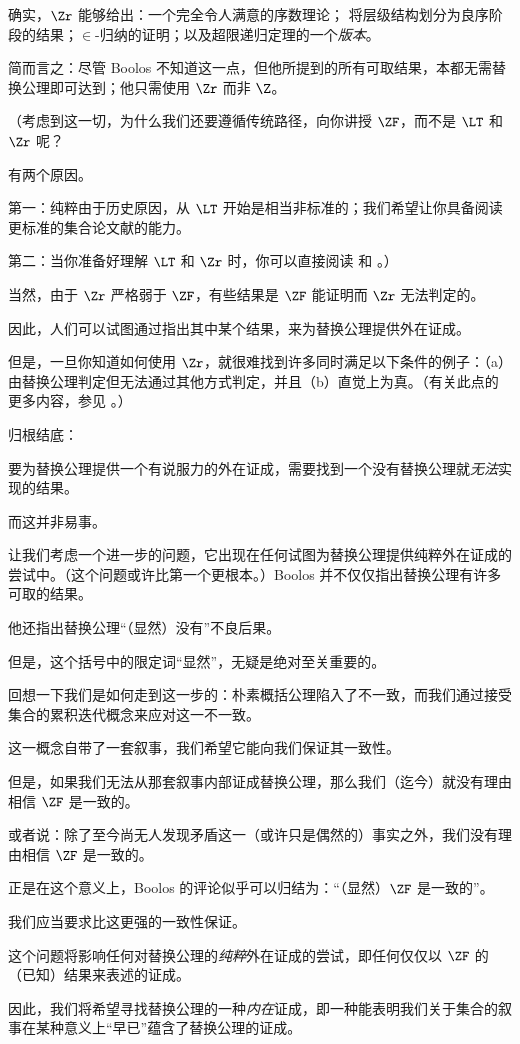 \documentclass[../../../include/open-logic-section]{subfiles}
\begin{document}
确实，$\Zr$ 能够给出：一个完全令人满意的序数理论；
将层级结构划分为良序阶段的结果；$\in$-归纳的证明；以及超限递归定理的一个\emph{版本}。

简而言之：尽管 Boolos 不知道这一点，但他所提到的所有可取结果，本都无需替换公理即可达到；他只需使用 $\Zr$ 而非 $\Z$。

（考虑到这一切，为什么我们还要遵循传统路径，向你讲授 $\ZF$，而不是 $\LT$ 和 $\Zr$ 呢？

有两个原因。

第一：纯粹由于历史原因，从 $\LT$ 开始是相当非标准的；我们希望让你具备阅读更标准的集合论文献的能力。

第二：当你准备好理解 $\LT$ 和 $\Zr$ 时，你可以直接阅读 \citealt{Potter2004} 和 \citealt{ButtonLT1}。）

当然，由于 $\Zr$ 严格弱于 $\ZF$，有些结果是 $\ZF$ 能证明而 $\Zr$ 无法判定的。

因此，人们可以试图通过指出其中某个结果，来为替换公理提供外在证成。

但是，一旦你知道如何使用 $\Zr$，就很难找到许多同时满足以下条件的例子：（a）由替换公理判定但无法通过其他方式判定，并且（b）直觉上为真。（有关此点的更多内容，参见 \citealt[\S13.2]{Potter2004}。）

归根结底：

要为替换公理提供一个有说服力的外在证成，需要找到一个没有替换公理就\emph{无法}实现的结果。

而这并非易事。

让我们考虑一个进一步的问题，它出现在任何试图为替换公理提供纯粹外在证成的尝试中。（这个问题或许比第一个更根本。）Boolos 并不仅仅指出替换公理有许多可取的结果。

他还指出替换公理“（显然）没有”不良后果。

但是，这个括号中的限定词“显然”，无疑是绝对至关重要的。

回想一下我们是如何走到这一步的：朴素概括公理陷入了不一致，而我们通过接受集合的累积迭代概念来应对这一不一致。

这一概念自带了一套叙事，我们希望它能向我们保证其一致性。

但是，如果我们无法从那套叙事内部证成替换公理，那么我们（迄今）就没有理由相信 $\ZF$ 是一致的。

或者说：除了至今尚无人发现矛盾这一（或许只是偶然的）事实之外，我们没有理由相信 $\ZF$ 是一致的。

正是在这个意义上，Boolos 的评论似乎可以归结为：“（显然）$\ZF$ 是一致的”。

我们应当要求比这更强的一致性保证。

这个问题将影响任何对替换公理的\emph{纯粹}外在证成的尝试，即任何仅仅以 $\ZF$ 的（已知）结果来表述的证成。

因此，我们将希望寻找替换公理的一种\emph{内在}证成，即一种能表明我们关于集合的叙事在某种意义上“早已”蕴含了替换公理的证成。
\end{document}
